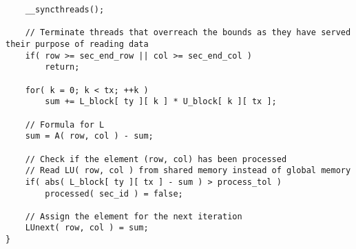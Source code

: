 \begin{lstlisting}
	__syncthreads();
	
	// Terminate threads that overreach the bounds as they have served their purpose of reading data
	if( row >= sec_end_row || col >= sec_end_col )
		return;
	
	for( k = 0; k < tx; ++k )
		sum += L_block[ ty ][ k ] * U_block[ k ][ tx ];
	
	// Formula for L
	sum = A( row, col ) - sum;
	
	// Check if the element (row, col) has been processed
	// Read LU( row, col ) from shared memory instead of global memory
	if( abs( L_block[ ty ][ tx ] - sum ) > process_tol )
		processed( sec_id ) = false;
	
	// Assign the element for the next iteration
	LUnext( row, col ) = sum;
}
\end{lstlisting}

